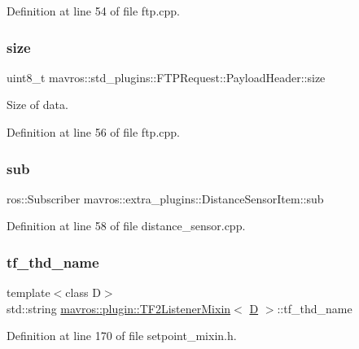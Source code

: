 Definition at line 54 of file ftp.\+cpp.

\mbox{\label{group__plugin_gaadeefe030ed0876e8f2d9d5a8b31eec8}} 
\subsubsection{\texorpdfstring{size}{size}}
{\footnotesize\ttfamily uint8\+\_\+t mavros\+::std\+\_\+plugins\+::\+F\+T\+P\+Request\+::\+Payload\+Header\+::size}



Size of data. 



Definition at line 56 of file ftp.\+cpp.

\mbox{\label{group__plugin_ga59362a543db0805a4669950637451270}} 
\subsubsection{\texorpdfstring{sub}{sub}}
{\footnotesize\ttfamily ros\+::\+Subscriber mavros\+::extra\+\_\+plugins\+::\+Distance\+Sensor\+Item\+::sub}



Definition at line 58 of file distance\+\_\+sensor.\+cpp.

\mbox{\label{group__plugin_gaff209548a5d3a38bdbf724ba30f9bcbb}} 
\subsubsection{\texorpdfstring{tf\_thd\_name}{tf\_thd\_name}}
{\footnotesize\ttfamily template$<$class D$>$ \\
std\+::string \mbox{\hyperlink{classmavros_1_1plugin_1_1TF2ListenerMixin}{mavros\+::plugin\+::\+T\+F2\+Listener\+Mixin}}$<$ \mbox{\hyperlink{mavlink__sha256_8h_af316c33cc298530f245e8b55330e86b5}{D}} $>$\+::tf\+\_\+thd\+\_\+name}



Definition at line 170 of file setpoint\+\_\+mixin.\+h.

\mbox{\label{group__plugin_ga5ac5c640e09c36aefab3741e96bcd3ab}} 
